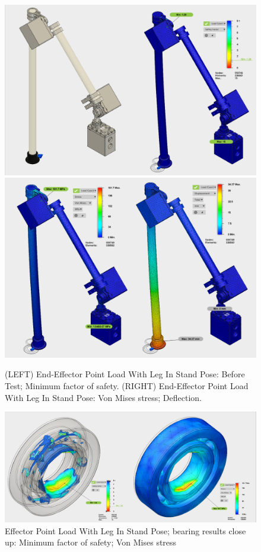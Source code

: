 \begin{figure}
\centering
\includegraphics[width=0.48\columnwidth]{./img/aquaShoko-v3dot3-FEA-WithBearing-1.png}\hspace{0.04\columnwidth}\includegraphics[width=0.48\columnwidth]{./img/aquaShoko-v3dot3-FEA-WithBearing-2.png}
\caption{(LEFT) End-Effector Point Load With Leg In Stand Pose: Before Test; Minimum factor of safety. (RIGHT) End-Effector Point Load With Leg In Stand Pose: Von Mises stress; Deflection.}
\label{fig:FEA EE factor of safety}\label{fig:FEA EE defection}
\end{figure}



\begin{figure}
\centering
\includegraphics[width=1.0\columnwidth]{./img/aquaShoko-v3dot3-FEA-bearingOnly.png}
\caption{Effector Point Load With Leg In Stand Pose; bearing results close up: Minimum factor of safety; Von Mises stress}
\label{fig:FEA EE bearing only}
\end{figure}







